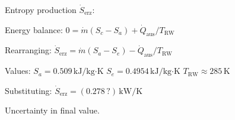 Entropy production \( \dot{S}_{\text{erz}} \):  

Energy balance:  
\( 0 = \dot{m} (S_c - S_a) + \dot{Q}_{\text{aus}} / T_{\text{RW}} \)  

Rearranging:  
\( \dot{S}_{\text{erz}} = \dot{m} (S_a - S_e) - \dot{Q}_{\text{aus}} / T_{\text{RW}} \)  

Values:  
\( S_a = 0.509 \, \text{kJ/kg·K} \)  
\( S_e = 0.4954 \, \text{kJ/kg·K} \)  
\( T_{\text{RW}} \approx 285 \, \text{K} \)  

Substituting:  
\( \dot{S}_{\text{erz}} = (0.278 \, ?) \, \text{kW/K} \)  

Uncertainty in final value.